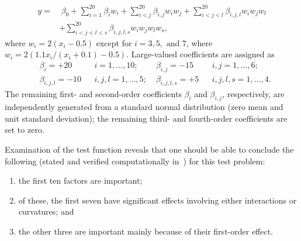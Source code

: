 \begin{align*}
y = &\;\beta_0 + \sum_{i=1}^{20}{\beta_i w_i} + \sum_{i<j}^{20}{\beta_{i,j} w_i w_j} + \sum_{i<j<l}^{20}{\beta_{i,j,l} w_i w_j w_l} \\
    &+  \sum_{i<j<l<s}^{20}{\beta_{i,j,l,s} w_i w_j w_l w_s},
\end{align*}
where $w_i = 2(x_i-0.5)$ except for $i=3, 5, \mbox{ and } 7$, where $w_i=2(1.1x_i/(x_i+0.1) - 0.5)$.  Large-valued coefficients are assigned as 
\begin{align*}
&\beta_i = +20 & &i=1,\ldots,10; \;&\beta_{i,j} = -15& &i,j = 1, \ldots, 6; \\
&\beta_{i,j,l} = -10& &i,j,l=1,\ldots,5; \;&\beta_{i,j,l,s} = +5& &i,j,l,s = 1, \ldots, 4.
\end{align*}
The remaining first- and second-order coefficients $\beta_i$ and
$\beta_{i,j}$, respectively, are independently generated from a
standard normal distribution (zero mean and unit standard deviation);
the remaining third- and fourth-order coefficients are set to zero.

Examination of the test function reveals that one should be able to
conclude the following (stated and verified computationally
in~\cite{Sal04}) for this test problem:
\begin{enumerate}
\item the first ten factors are important;
\item of these, the first seven have significant effects involving
      either interactions or curvatures; and
\item the other three are important mainly because of their first-order
      effect.
\end{enumerate}

